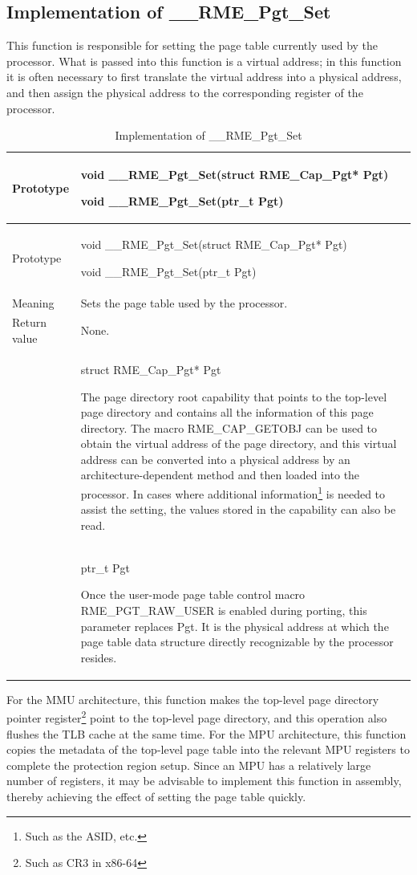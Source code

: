 \subsection{Implementation of \_\_RME\_Pgt\_Set}\label{subsec:7-rme-pgt-set-implementation}

This function is responsible for setting the page table currently used by the processor. What is passed into this function is a virtual address; in this function it is often necessary to first translate the virtual address into a physical address, and then assign the physical address to the corresponding register of the processor.

\begin{xltabular}{\textwidth}{@{}>{\hsize\raggedright\arraybackslash}X>{\hsize\raggedright\arraybackslash}X@{}}
\caption{Implementation of \_\_RME\_Pgt\_Set}\label{tab:7-74-rme-pgt-set-implementation}\\
\toprule
Prototype\strut
 & void \_\_RME\_Pgt\_Set(struct RME\_Cap\_Pgt* Pgt)

void \_\_RME\_Pgt\_Set(ptr\_t Pgt)\strut
\tabularnewline
\endfirsthead
\toprule
Prototype\strut
 & void \_\_RME\_Pgt\_Set(struct RME\_Cap\_Pgt* Pgt)

void \_\_RME\_Pgt\_Set(ptr\_t Pgt)\strut
\tabularnewline
\midrule
\endhead
\bottomrule
\endlastfoot
Meaning & Sets the page table used by the processor.\tabularnewline
Return value & None.\tabularnewline
{} & struct RME\_Cap\_Pgt* Pgt

The page directory root capability that points to the top-level page directory and contains all the information of this page directory. The macro RME\_CAP\_GETOBJ can be used to obtain the virtual address of the page directory, and this virtual address can be converted into a physical address by an architecture-dependent method and then loaded into the processor. In cases where additional information\footnote{Such as the ASID, etc.} is needed to assist the setting, the values stored in the capability can also be read.\strut
\tabularnewline
\strut
 & ptr\_t Pgt

Once the user-mode page table control macro RME\_PGT\_RAW\_USER is enabled during porting, this parameter replaces Pgt. It is the physical address at which the page table data structure directly recognizable by the processor resides.\strut
\tabularnewline
\end{xltabular}
\nopagebreak[4]

For the MMU architecture, this function makes the top-level page directory pointer register\footnote{Such as CR3 in x86-64} point to the top-level page directory, and this operation also flushes the TLB cache at the same time. For the MPU architecture, this function copies the metadata of the top-level page table into the relevant MPU registers to complete the protection region setup. Since an MPU has a relatively large number of registers, it may be advisable to implement this function in assembly, thereby achieving the effect of setting the page table quickly.

